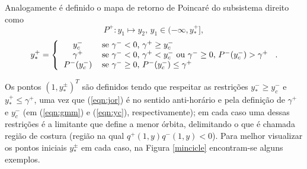 Analogamente é definido o mapa de retorno de Poincaré do subsistema direito como
\begin{equation}
\label{right}
P^+:y_1\mapsto y_2\text{, }y_1\in(-\infty,y_*^+],
\end{equation}
\[
y_*^+=
\left\{
\begin{tabular}{cl}
$y_c^-$&se $\gamma^-<0\text{, }\gamma^+\geq y_c^-$\\
$\gamma^+$&se $\gamma^-<0\text{, }\gamma^+<y_c^-\text{ ou }\gamma^-\geq0\text{, }P^-(y_c^-)>\gamma^+$\\
$P^-(y_c^-)$&se $\gamma^-\geq0\text{, }P^-(y_c^-)\leq\gamma^+$
\end{tabular}
\right..
\]

Os pontos $(1,y_*^\pm)^T$ são definidos tendo que respeitar as restrições $y_*^-\geq y_c^-$ e $y_*^+\leq \gamma^+$, uma vez que (\ref{eqn:jor}) é no sentido anti-horário e pela definição de $\gamma^+$ e $y_c^-$ (em (\ref{eqn:gmm}) e (\ref{eqn:yc}), respectivamente); em cada caso uma dessas restrições é a limitante que define a menor órbita, delimitando o que é chamada região de costura (região na qual $q^+(1,y)q^-(1,y)<0$). Para melhor visualizar os pontos iniciais $y_*^\pm$ em cada caso, na Figura \ref{mincicle} encontram-se alguns exemplos.

